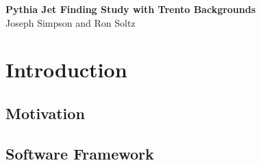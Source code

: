 \documentclass[11pt]{article}
\begin{document}
%
%
\newcommand{\zapspace}{\topsep=1pt\partopsep=1pt\itemsep=1pt\parskip=2pt}
\newcommand{\trento}{\mbox{T$_{\rm R}$ENTo}}

\begin{center}
{\Large \bf Pythia Jet Finding Study with Trento Backgrounds\\}
\bigskip
Joseph Simpson and Ron Soltz
\end{center}

\begin{abstract}
We present results applying the Pythia SlowJet Finder to Pythia generated QCD and QED hard processes in the presence of simulated heavy ion backgrounds.  The hard process events are generated with Pythia version~8.219 for $\sqrt{s}$200~GeV proton-proton collisions and the backgrounds are generated by the Reduced Thickness Event-by-event Nuclear Topology model \trento\ for Au-Au collisions with a nucleon-nucleon cross-section of 4.23~fm$^2$.  The \trento\ model is used to determine the initial entropy and ellipticity from which the the total charged particle multiplicity and elliptic flow are determined.  We report results in the form of event displays, total $p_T$ distributions, and fragmentation distributions for SlowJet applied to Pythia events with and without the simulated heavy ion backgrounds.
\end{abstract}

\tableofcontents

\newpage 

\section{Introduction}
%
%

\subsection{Motivation}

\subsection{Software Framework}
\end{document}

